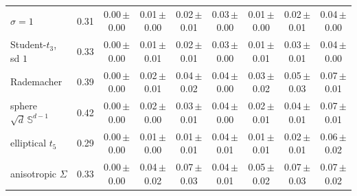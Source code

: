 \begin{tabular}{lcc|ccc|ccc}
$\sigma=1$ & 0.31 & 0.00\,{\scriptsize$\pm$0.00} & 0.01\,{\scriptsize$\pm$0.00} & 0.02\,{\scriptsize$\pm$0.01} & 0.03\,{\scriptsize$\pm$0.00} & 0.01\,{\scriptsize$\pm$0.00} & 0.02\,{\scriptsize$\pm$0.01} & 0.04\,{\scriptsize$\pm$0.00} \\
Student-$t_3$, sd $1$ & 0.33 & 0.00\,{\scriptsize$\pm$0.00} & 0.01\,{\scriptsize$\pm$0.01} & 0.02\,{\scriptsize$\pm$0.01} & 0.03\,{\scriptsize$\pm$0.00} & 0.01\,{\scriptsize$\pm$0.01} & 0.03\,{\scriptsize$\pm$0.01} & 0.04\,{\scriptsize$\pm$0.00} \\
\midrule
Rademacher & 0.39 & 0.00\,{\scriptsize$\pm$0.00} & 0.02\,{\scriptsize$\pm$0.01} & 0.04\,{\scriptsize$\pm$0.02} & 0.04\,{\scriptsize$\pm$0.00} & 0.03\,{\scriptsize$\pm$0.02} & 0.05\,{\scriptsize$\pm$0.03} & 0.07\,{\scriptsize$\pm$0.01} \\
sphere $\sqrt{d}\,\mathbb{S}^{d-1}$ & 0.42 & 0.00\,{\scriptsize$\pm$0.00} & 0.02\,{\scriptsize$\pm$0.00} & 0.03\,{\scriptsize$\pm$0.01} & 0.04\,{\scriptsize$\pm$0.00} & 0.02\,{\scriptsize$\pm$0.01} & 0.04\,{\scriptsize$\pm$0.01} & 0.07\,{\scriptsize$\pm$0.01} \\
elliptical $t_5$ & 0.29 & 0.00\,{\scriptsize$\pm$0.00} & 0.01\,{\scriptsize$\pm$0.00} & 0.01\,{\scriptsize$\pm$0.01} & 0.04\,{\scriptsize$\pm$0.01} & 0.01\,{\scriptsize$\pm$0.01} & 0.02\,{\scriptsize$\pm$0.01} & 0.06\,{\scriptsize$\pm$0.02} \\
anisotropic $\Sigma$ & 0.33 & 0.00\,{\scriptsize$\pm$0.00} & 0.04\,{\scriptsize$\pm$0.02} & 0.07\,{\scriptsize$\pm$0.03} & 0.04\,{\scriptsize$\pm$0.01} & 0.05\,{\scriptsize$\pm$0.02} & 0.07\,{\scriptsize$\pm$0.03} & 0.07\,{\scriptsize$\pm$0.02} \\
\bottomrule
\end{tabular}

